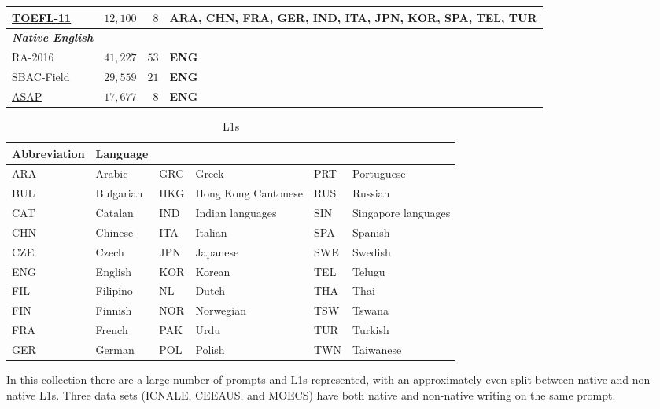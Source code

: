 \documentclass[12pt]{article}
\begin{document}
\begin {table}
\begin{center}
\begin{tabularx}{\textwidth}{l r r X}
\href{https://catalog.ldc.upenn.edu/LDC2014T06}{TOEFL-11} & $12,100$ & $8$ & ARA, CHN, FRA, GER, IND, ITA, \newline JPN, KOR, SPA, TEL, TUR \\
\hline
\textbf{\textit{Native English}} \\
\hline
RA-2016 & $41,227$ & $53$ & \textbf{ENG} \\
SBAC-Field & $29,559$ & $21$ & \textbf{ENG} \\
\href{https://www.kaggle.com/c/asap-aes/data}{ASAP} & $17,677$ & $8$ & \textbf{ENG} \\
\end{tabularx}
\end{center}
\end{table}

\begin {table}
\caption {L1s}
\label{table:L1s}
\begin{center}
\begin{tabularx}{\textwidth}{l l l l l l }
Abbreviation & Language \\
\hline
ARA & Arabic &    GRC  & Greek   &          PRT  & Portuguese \\
BUL & Bulgarian &      HKG  &  Hong Kong Cantonese       &    RUS  & Russian \\
CAT & Catalan &    IND  & Indian languages   &           SIN  & Singapore languages \\
CHN & Chinese &    ITA  & Italian        &   SPA  & Spanish \\
CZE & Czech &     JPN  & Japanese         &     SWE  & Swedish \\
ENG & English &    KOR  & Korean         &   TEL  & Telugu \\
FIL & Filipino &       NL  &  Dutch      &       THA &  Thai \\
FIN & Finnish &    NOR &  Norwegian       &      TSW  & Tswana \\
FRA & French &     PAK  & Urdu         &     TUR  & Turkish \\
GER & German &     POL  & Polish    &        TWN  & Taiwanese
\end{tabularx}
\end{center}
\end{table}

In this collection there are a large number of prompts and L1s represented, with
an approximately even split between native and non-native L1s. Three data sets
(ICNALE, CEEAUS, and MOECS) have both native and non-native writing on the same
prompt.
\end{document}
